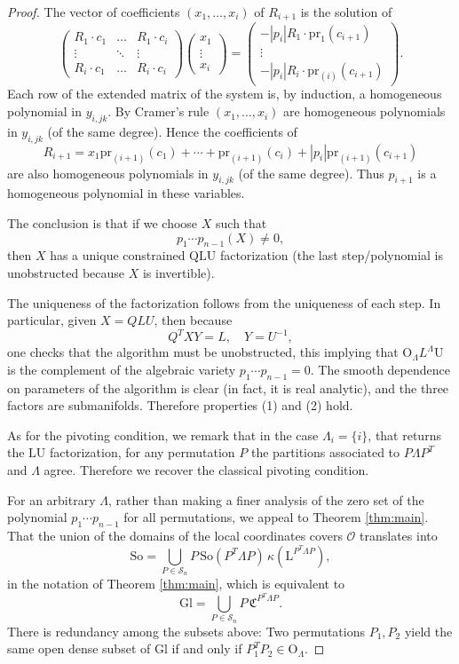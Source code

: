 \documentclass[reqno]{amsart}
\newcommand{\cO}{\mathcal{O}}
\newcommand{\cS}{\mathcal{S}}
\newcommand{\pr}{\mathrm{pr}}
\newcommand{\Gl}{\mathrm{Gl}}
\newcommand{\So}{\mathrm{So}}
\renewcommand{\L}{\mathrm{L}}
\newcommand{\U}{\mathrm{U}}
\theoremstyle{definition} %
\begin{document}
\begin{proof}
The vector of coefficients $(x_1,\dots,x_i)$ of $R_{i+1}$ is the solution of
\[\begin{pmatrix} R_1\cdot c_1 &  \ldots & R_1\cdot c_i \\
\vdots  & \ddots & \vdots  \\
R_i\cdot c_1 & \ldots & R_i\cdot c_i
  \end{pmatrix}\begin{pmatrix} x_1 \\\vdots \\ x_i\end{pmatrix}=\begin{pmatrix} -|p_i|R_1\cdot \pr_{1}(c_{i+1}) \\\vdots \\ -|p_i|R_i\cdot \pr_{(i)}(c_{i+1})\end{pmatrix}.
   \]
 Each row of the extended matrix of the system is, by induction, a homogeneous polynomial in $y_{i,jk}$. By Cramer's rule $(x_1,\dots,x_i)$ are homogeneous polynomials in $y_{i,jk}$ (of the same degree). Hence the coefficients of
 \[R_{i+1}=x_1\pr_{(i+1)}(c_1)+\cdots+\pr_{(i+1)}(c_i)+|p_i|\pr_{(i+1)}(c_{i+1})\]
are also homogeneous polynomials in $y_{i,jk}$ (of the same degree). Thus $p_{i+1}$ is a homogeneous polynomial in these variables.

The conclusion is that if we choose $X$ such that
\[p_1\cdots p_{n-1}(X)\neq 0,\]
then $X$ has a unique constrained $\mathrm{Q}\L\U$ factorization (the last step/polynomial is unobstructed because $X$ is invertible).

The uniqueness of the factorization follows from the uniqueness of each step. In particular, given $X=QLU$, then because 
\[Q^T XY=L,\quad Y=U^{-1},\]
one checks that the algorithm must be unobstructed, this implying that  $\mathrm{O}_\Lambda L^\Lambda\mathrm{U}$ is the complement of the algebraic variety $p_1\cdots p_{n-1}=0$. The smooth dependence on parameters of the algorithm is clear (in fact, it is real analytic), and the three factors are submanifolds. Therefore properties (1) and (2) hold.

As for the pivoting condition, we remark that in the case $\Lambda_{i}=\{i\}$, that returns the $\L\U$ factorization, for any permutation $P$ the partitions associated to   $P\Lambda P^T$ and $\Lambda$ agree. Therefore we recover the classical pivoting condition.

For an arbitrary $\Lambda$, rather than making a finer analysis of the  zero set of the polynomial
$p_1\cdots p_{n-1}$ for all permutations, we appeal to Theorem \ref{thm:main}. That the union of the domains of the local coordinates covers $\cO$ translates into
\[\So=\bigcup_{P\in \cS_n} P\, \So(P^T\Lambda P)\, \kappa(\L^{P^T\Lambda P}),\]
in the notation of Theorem \ref{thm:main}, which is equivalent to
\[\Gl=\bigcup_{P\in \cS_n} P\, \mathfrak{C}^{P^T\Lambda P}.\]
There is redundancy among the subsets above: Two permutations $P_1,P_2$ yield the same open dense subset of $\Gl$ if and only if $P^T_1P_2\in \mathrm{O}_\Lambda$.
\end{proof}
\end{document}
